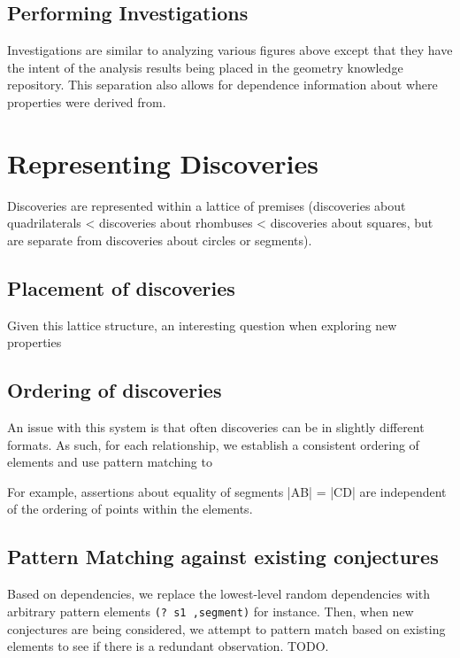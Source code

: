\subsection{Performing Investigations}

Investigations are similar to analyzing various figures above except
that they have the intent of the analysis results being placed in the
geometry knowledge repository. This separation also allows for
dependence information about where properties were derived from.

\section{Representing Discoveries}

Discoveries are represented within a lattice of premises (discoveries
about quadrilaterals < discoveries about rhombuses < discoveries about
squares, but are separate from discoveries about circles or segments).

\subsection{Placement of discoveries}

Given this lattice structure, an interesting question when exploring
new properties

\subsection{Ordering of discoveries}

An issue with this system is that often discoveries can be in slightly
different formats. As such, for each relationship, we establish a
consistent ordering of elements and use pattern matching to

For example, assertions about equality of segments |AB| = |CD| are
independent of the ordering of points within the elements.

\subsection{Pattern Matching against existing conjectures}

Based on dependencies, we replace the lowest-level random dependencies
with arbitrary pattern elements \texttt{(? s1 ,segment)} for
instance. Then, when new conjectures are being considered, we attempt
to pattern match based on existing elements to see if there is a
redundant observation. TODO.
